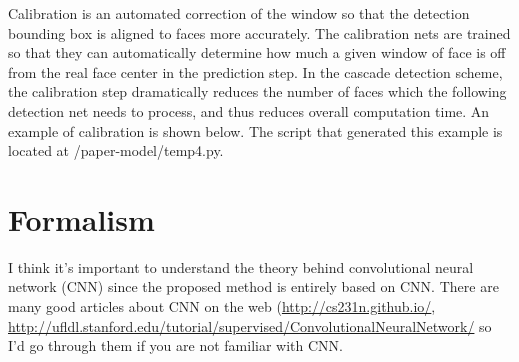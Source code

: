 \documentclass[twoside]{article}
\theoremstyle{definition}
\theoremstyle{definition}
\theoremstyle{remark}
\begin{document}
Calibration is an automated correction of the window so that the detection bounding box is aligned to faces more accurately. The calibration nets are trained so that they can automatically determine how much a given window of face is off from the real face center in the prediction step. In the cascade detection scheme, the calibration step dramatically reduces the number of faces which the following detection net needs to process, and thus reduces overall computation time. An example of calibration is shown below. The script that generated this example is located at /paper-model/temp4.py.


\section{Formalism}

I think it's important to understand the theory behind convolutional neural network (CNN) since the proposed method is entirely based on CNN. There are many good articles about CNN on the web (\url{http://cs231n.github.io/}, \url{http://ufldl.stanford.edu/tutorial/supervised/ConvolutionalNeuralNetwork/} so I'd go through them if you are not familiar with CNN. 
\end{document}
